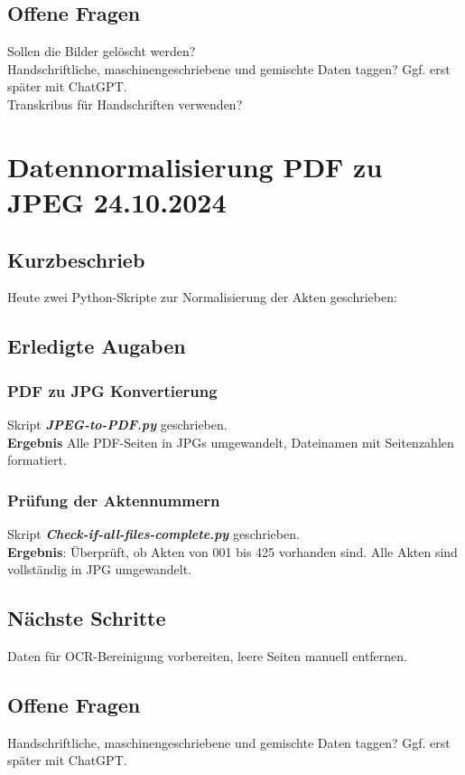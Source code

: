 \documentclass{article}
\begin{document}
\subsection*{Offene Fragen}
 Sollen die Bilder gelöscht werden?\\
 Handschriftliche, maschinengeschriebene und gemischte Daten taggen? Ggf. erst später mit ChatGPT.\\
 Transkribus für Handschriften verwenden?


\noindent\hrulefill

\section{Datennormalisierung PDF zu JPEG \small 24.10.2024}
\subsection*{Kurzbeschrieb}
Heute zwei Python-Skripte zur Normalisierung der Akten geschrieben:

\subsection*{Erledigte Augaben}
\subsubsection*{\small PDF zu JPG Konvertierung}
 Skript \textbf{\textit{JPEG-to-PDF.py}} geschrieben.  \\
\textbf{Ergebnis} Alle PDF-Seiten in JPGs umgewandelt, Dateinamen mit Seitenzahlen formatiert.

\subsubsection*{\small Prüfung der Aktennummern}
 Skript \textbf{\textit{Check-if-all-files-complete.py}} geschrieben. \\
\textbf{Ergebnis}: Überprüft, ob Akten von 001 bis 425 vorhanden sind. Alle Akten sind vollständig in JPG umgewandelt.

\subsection*{Nächste Schritte}
 Daten für OCR-Bereinigung vorbereiten, leere Seiten manuell entfernen.
\subsection*{Offene Fragen}
 Handschriftliche, maschinengeschriebene und gemischte Daten taggen? Ggf. erst später mit ChatGPT.

\noindent\hrulefill

\end{document}
